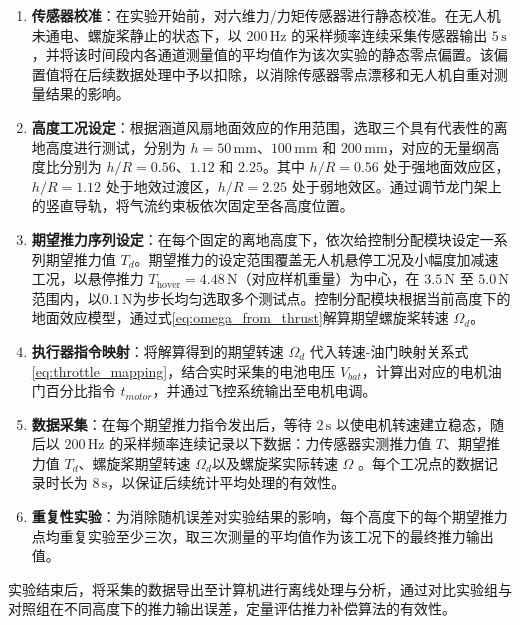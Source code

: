 \begin{enumerate}
    \item \textbf{传感器校准}：在实验开始前，对六维力/力矩传感器进行静态校准。在无人机未通电、螺旋桨静止的状态下，以 \(200\,\mathrm{Hz}\) 的采样频率连续采集传感器输出 \(5\,\mathrm{s}\)，并将该时间段内各通道测量值的平均值作为该次实验的静态零点偏置。该偏置值将在后续数据处理中予以扣除，以消除传感器零点漂移和无人机自重对测量结果的影响。
    
    \item \textbf{高度工况设定}：根据涵道风扇地面效应的作用范围，选取三个具有代表性的离地高度进行测试，分别为 \(h = 50\,\mathrm{mm}\)、\(100\,\mathrm{mm}\) 和 \(200\,\mathrm{mm}\)，对应的无量纲高度比分别为 \(h/R = 0.56\)、\(1.12\) 和 \(2.25\)。其中 \(h/R = 0.56\) 处于强地面效应区，\(h/R = 1.12\) 处于地效过渡区，\(h/R = 2.25\) 处于弱地效区。通过调节龙门架上的竖直导轨，将气流约束板依次固定至各高度位置。
    
    \item \textbf{期望推力序列设定}：在每个固定的离地高度下，依次给控制分配模块设定一系列期望推力值 \(T_d\)。期望推力的设定范围覆盖无人机悬停工况及小幅度加减速工况，以悬停推力 \(T_{\mathrm{hover}} = 4.48\,\mathrm{N}\)（对应样机重量）为中心，在 \(3.5\,\mathrm{N}\) 至 \(5.0\,\mathrm{N}\) 范围内，以\(0.1\,\mathrm{N}\)为步长均匀选取多个测试点。控制分配模块根据当前高度下的地面效应模型，通过式\eqref{eq:omega_from_thrust}解算期望螺旋桨转速 \(\Omega_d\)。
    
    \item \textbf{执行器指令映射}：将解算得到的期望转速 \(\Omega_d\) 代入转速-油门映射关系式\eqref{eq:throttle_mapping}，结合实时采集的电池电压 \(V_{bat}\)，计算出对应的电机油门百分比指令 \(t_{motor}\)，并通过飞控系统输出至电机电调。
    
    \item \textbf{数据采集}：在每个期望推力指令发出后，等待 \(2\,\mathrm{s}\) 以使电机转速建立稳态，随后以 \(200\,\mathrm{Hz}\) 的采样频率连续记录以下数据：力传感器实测推力值 \(T\)、期望推力值 \(T_d\)、螺旋桨期望转速 \(\Omega_d\)以及螺旋桨实际转速 \(\Omega\) 。每个工况点的数据记录时长为 \(8\,\mathrm{s}\)，以保证后续统计平均处理的有效性。
    
    \item \textbf{重复性实验}：为消除随机误差对实验结果的影响，每个高度下的每个期望推力点均重复实验至少三次，取三次测量的平均值作为该工况下的最终推力输出值。
\end{enumerate}

实验结束后，将采集的数据导出至计算机进行离线处理与分析，通过对比实验组与对照组在不同高度下的推力输出误差，定量评估推力补偿算法的有效性。

